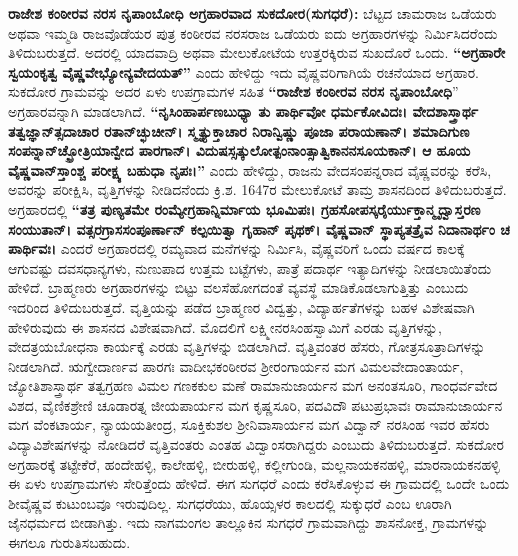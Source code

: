 \textbf{ರಾಜೇಶ ಕಂಠೀರವ ನರಸ ನೃಪಾಂಬೋಧಿ ಅಗ್ರಹಾರವಾದ ಸುಕದೋರ(ಸುಗಧರೆ):} ಬೆಟ್ಟದ ಚಾಮರಾಜ ಒಡೆಯರು ಅಥವಾ ಇಮ್ಮಡಿ ರಾಜವೊಡೆಯರ ಪುತ್ರ ಕಂಠೀರವ ನರಸರಾಜ ಒಡೆಯರು ಐದು ಅಗ್ರಹಾರಗಳನ್ನು ನಿರ್ಮಿಸಿದರೆಂದು ತಿಳಿದುಬರುತ್ತದೆ. ಅದರಲ್ಲಿ ಯಾದವಾದ್ರಿ ಅಥವಾ ಮೇಲುಕೋಟೆಯ ಉತ್ತರಕ್ಕಿರುವ ಸುಖದೊರೆ ಒಂದು. \textbf{“ಅಗ್ರಹಾರೇ ಸ್ವಯಂಕೃತ್ವ ವೈಷ್ಣವೇಭ್ಯೋನ್ಯವೇದಯತ್​”} ಎಂದು ಹೇಳಿದ್ದು ಇದು ವೈಷ್ಣವರಿಗಾಗಿಯೆ ರಚನೆಯಾದ ಅಗ್ರಹಾರ. ಸುಕದೋರ ಗ್ರಾಮವನ್ನು ಅದರ ಏಳು ಉಪಗ್ರಾಮಗಳ ಸಹಿತ \textbf{“ರಾಜೇಶ ಕಂಠೀರವ ನರಸ ನೃಪಾಂಬೋಧಿ}” ಅಗ್ರಹಾರವನ್ನಾಗಿ ಮಾಡಲಾಗಿದೆ. \textbf{“ನೃಸಿಂಹಾರ್ಪಣಬುಧ್ಯಾ ತು ಪಾರ್ಥಿವೋ ಧರ್ಮಕೋವಿದಃ। ವೇದಶಾಸ್ತ್ರಾರ್ಥ ತತ್ವಜ್ಞಾನ್​ತ್ಸದಾಚಾರ ರತಾನ್​ಚ್ಛುಚೀನ್​। ಸ್ಮೃತ್ಯುಕ್ತಾಚಾರ ನಿರಾನ್ವಿಷ್ಣು ಪೂಜಾ ಪರಾಯಣಾನ್​। ಶಮಾದಿಗುಣ ಸಂಪನ್ನಾನ್​ ಚ್ಛ್ರೋತ್ರಿಯಾನ್ವೇದ ಪಾರಗಾನ್​।\general{\break } ವಿದುಷಸ್ಸತ್ಕುಲೋತ್ಪಂನಾಂತ್ಸಾತ್ವಿಕಾನನಸೂಯಕಾನ್​। ಆ ಹೂಯ ವೈಷ್ಣವಾನ್​ಸ್ತಾಂಶ್ಚ ಪರೀಕ್ಷ್ಯ ಬಹುಧಾ ನೃಪಃ।”} ಎಂದು ಹೇಳಿದ್ದು, ರಾಜನು ವೇದಸಂಪನ್ನರಾದ ವೈಷ್ಣವರನ್ನು ಕರೆಸಿ, ಅವರನ್ನು ಪರೀಕ್ಷಿಸಿ, ವೃತ್ತಿಗಳನ್ನು ನೀಡಿದನೆಂದು ಕ್ರಿ.ಶ. 1647ರ ಮೇಲುಕೋಟೆ ತಾಮ್ರ ಶಾಸನದಿಂದ ತಿಳಿದುಬರುತ್ತದೆ. ಅಗ್ರಹಾರದಲ್ಲಿ \textbf{“ತತ್ರ ಪುಣ್ಯತಮೇ ರಂಮ್ಯೇಗ್ರಹಾನ್ನಿರ್ಮಾಯ ಭೂಮಿಪಃ। ಗ್ರಹಸೋಪಸ್ಕರೈರ್ಯುಕ್ತಾನ್ಮೃದ್ವಾಸ್ತರಣ ಸಂಯುತಾನ್​। ವತ್ಸರಗ್ರಾಸಸಂಪೂರ್ಣಾನ್​ ಕಲ್ಪಯಿತ್ವಾ ಗೃಹಾನ್​ ಪೃಥಕ್​। ವೈಷ್ಣವಾನ್​ ಸ್ಥಾಪ್ಯತತ್ರೈವ ನಿದಾನಾರ್ಥಂ ಚ ಪಾರ್ಥಿವಃ।} ಎಂದರೆ ಅಗ್ರಹಾರದಲ್ಲಿ ರಮ್ಯವಾದ ಮನೆಗಳನ್ನು ನಿರ್ಮಿಸಿ, ವೈಷ್ಣವರಿಗೆ ಒಂದು ವರ್ಷದ ಕಾಲಕ್ಕೆ ಆಗುವಷ್ಟು ದವಸಧಾನ್ಯಗಳು, ನುಣುಪಾದ ಉತ್ತಮ ಬಟ್ಟೆಗಳು, ಪಾತ್ರೆ ಪದಾರ್ಥ ಇತ್ಯಾದಿಗಳನ್ನು ನೀಡಲಾಯಿತೆಂದು ಹೇಳಿದೆ. ಬ್ರಾಹ್ಮಣರು ಅಗ್ರಹಾರಗಳನ್ನು ಬಿಟ್ಟು ವಲಸೆಹೋಗದಂತೆ ವ್ಯವಸ್ಥೆ ಮಾಡಿಕೊಡ\-ಲಾಗುತ್ತಿತ್ತು ಎಂಬುದು ಇದರಿಂದ ತಿಳಿದು\-ಬರುತ್ತದೆ. ವೃತ್ತಿಯನ್ನು ಪಡೆದ ಬ್ರಾಹ್ಮಣರ ವಿದ್ವತ್ತು, ವಿದ್ಯಾರ್ಹತೆಗಳನ್ನು ಬಹಳ ವಿಶೇಷವಾಗಿ ಹೇಳಿರುವುದು ಈ ಶಾಸನದ ವಿಶೇಷವಾಗಿದೆ. ಮೊದಲಿಗೆ ಲಕ್ಷ್ಮೀನರಸಿಂಹಸ್ವಾಮಿಗೆ ಎರಡು ವೃತ್ತಿಗಳನ್ನು, ವೇದತ್ರಯಬೋಧನಾ ಕಾರ್ಯಕ್ಕೆ ಎರಡು ವೃತ್ತಿಗಳನ್ನು ಬಿಡಲಾಗಿದೆ. ವೃತ್ತಿವಂತರ ಹೆಸರು, ಗೋತ್ರಸೂತ್ರಾದಿಗಳನ್ನು ನೀಡಲಾಗಿದೆ. ಋಗ್ವೇದಾರ್ಣವ ಪಾರಗಃ ವಾದೀಭಕಂಠೀರವ ಶ‍್ರೀರಂಗಾರ್ಯನ ಮಗ ವಿಮಲವೇದಾಂತಾರ್ಯ, ಜ್ಯೋತಿಶಾಸ್ತ್ರಾರ್ಥ ತತ್ವಗ್ರಹಣ ವಿಮಲ ಗಣಕಕುಲ ಮಣೆ ರಾಮಾನುಜಾರ್ಯನ ಮಗ ಅನಂತಸೂರಿ, ಗಾಂಧರ್ವವೇದ ವಿಶದ, ವೈಣಿಕಶ್ರೇಣಿ ಚೂಡಾರತ್ನ ಜೀಯಪಾರ್ಯನ ಮಗ ಕೃಷ್ಣಸೂರಿ, ಪದವಿದೌ ಪಟುಪ್ರಭಾವಃ ರಾಮಾನುಜಾರ್ಯನ ಮಗ ವೆಂಕಟಾರ್ಯ, ನ್ಯಾಯಯತೀಂದ್ರ, ಸೂಕ್ತಿಕುಶಲ ಶ‍್ರೀನಿವಾಸಾರ್ಯನ ಮಗ ವಿದ್ವಾನ್​ ನರಸಿಂಹ ಇವರ ಹೆಸರು ವಿದ್ಯಾವಿಶೇಷಗಳನ್ನು ನೋಡಿದರೆ ವೃತ್ತಿವಂತರು ಎಂತಹ ವಿದ್ವಾಂಸರಾಗಿದ್ದರು ಎಂಬುದು ತಿಳಿದುಬರುತ್ತದೆ. ಸುಕದೋರ ಅಗ್ರಹಾರಕ್ಕೆ ತಟ್ಟೇಕೆರೆ, ಹಂದೇಹಳ್ಳಿ, ಕಾಲೇಹಳ್ಳಿ, ಬೀರುಹಳ್ಳಿ, ಕಲ್ಲೀಗುಂಡಿ, ಮಲ್ಲನಾಯಕನಹಳ್ಳಿ, ಮಾರನಾಯಕನಹಳ್ಳಿ ಈ ಏಳು ಉಪಗ್ರಾಮಗಳು ಸೇರಿತ್ತೆಂದು ಹೇಳಿದೆ. ಈಗ ಸುಗಧರೆ ಎಂದು ಕರೆಸಿಕೊಳ್ಳುವ ಈ ಗ್ರಾಮದಲ್ಲಿ ಒಂದೇ ಒಂದು ಶೀವೈಷ್ಣವ ಕುಟುಂಬವೂ ಇರುವುದಿಲ್ಲ. ಸುಗಧರೆಯು, ಹೊಯ್ಸಳರ ಕಾಲದಲ್ಲಿ ಸುಕ್ಕುಧರೆ ಎಂಬ ಊರಾಗಿ ಜೈನಧರ್ಮದ ಬೀಡಾಗಿತ್ತು. ಇದು ನಾಗಮಂಗಲ ತಾಲ್ಲೂಕಿನ ಸುಗಧರೆ ಗ್ರಾಮವಾಗಿದ್ದು ಶಾಸನೋಕ್ತ, ಗ್ರಾಮಗಳನ್ನು ಈಗಲೂ ಗುರುತಿಸಬಹುದು.

